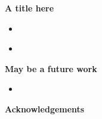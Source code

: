 \documentclass[a0,portrait]{a0poster}
\begin{document}
\begin{multicols}{3}\setlength{\columnseprule}{0pt}
 \begin{tcolorbox}[colback=morange!5!white]
 \Large  \textbf{A title here}
 \begin{itemize}
 \item 
 \end{itemize}
 \end{tcolorbox}

 \begin{center}
 \end{center}
 
 \begin{center}
 \end{center}


\end{multicols}
\begin{tcolorbox}[colback=morange!2!white,colframe=morange!100!white,title=\Huge Discussions \& Future work,boxsep=5mm]
\begin{multicols}{3}\setlength{\columnseprule}{0pt}
  \begin{itemize}
  \item 
  \end{itemize}
   \begin{tcolorbox}[colback=mblue!15!white]
   \textbf{May be a future work}
  \begin{itemize}
  \item 
  \end{itemize}
  \end{tcolorbox}
  \textbf{Acknowledgements}
\end{multicols}
\end{tcolorbox}
\end{document}
